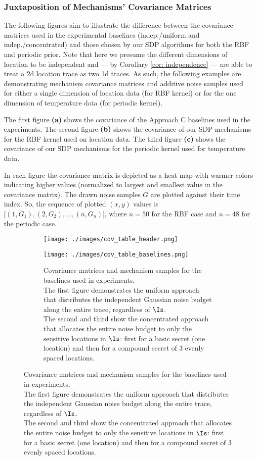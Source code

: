 \subsubsection{Juxtaposition of Mechanisms' Covariance Matrices}
\label{apx: juxtaposition}
The following figures aim to illustrate the difference between the covariance matrices used in the experimental baselines (indep./uniform and indep./concentrated) and those chosen by our SDP algorithms for both the RBF and periodic prior. Note that here we presume the different dimensions of location to be independent and --- by Corollary \ref{cor: independence} --- are able to treat a 2d location trace as two 1d traces. As such, the following examples are demonstrating mechanism covariance matrices and additive noise samples used for either a single dimension of location data (for RBF kernel) or for the one dimension of temperature data (for periodic kernel). 

The first figure \textbf{(a)} shows the covariance of the Approach C baselines used in the experiments. The second figure \textbf{(b)} shows the covariance of our SDP mechanisms for the RBF kernel used on location data. The third figure \textbf{(c)} shows the covariance of our SDP mechanisms for the periodic kernel used for temperature data. 

In each figure the covariance matrix is depicted as a heat map with warmer colors indicating higher values (normalized to largest and smallest value in the covariance matrix). The drawn noise samples $G$ are plotted against their time index. So, the sequence of plotted $(x,y)$ values is $\big[(1, G_1), (2, G_2), \dots, (n, G_n)\big]$, where $n = 50$ for the RBF case and $n = 48$ for the periodic case. 

\begin{figure*}[h]
	\centering
	\begin{subfigure}[b]{1\textwidth}
		\centering
		\texttt{[image: ./images/cov\_table\_header.png]}
	\end{subfigure}
	\begin{subfigure}[b]{1\textwidth}
		\centering
		\texttt{[image: ./images/cov\_table\_baselines.png]}
		\caption{Covariance matrices and mechanism samples for the baselines used in experiments. 
		\vspace{2mm}\\
		The first figure demonstrates the uniform approach that distributes the independent Gaussian noise budget along the entire trace, regardless of $\Is$. 
		\vspace{2mm}\\
		The second and third show the concentrated approach that allocates the entire noise budget to only the sensitive locations in $\Is$: first for a basic secret (one location) and then for a compound secret of 3 evenly spaced locations.} 
		\label{fig: cov table baselines}
	\end{subfigure}
\end{figure*}

